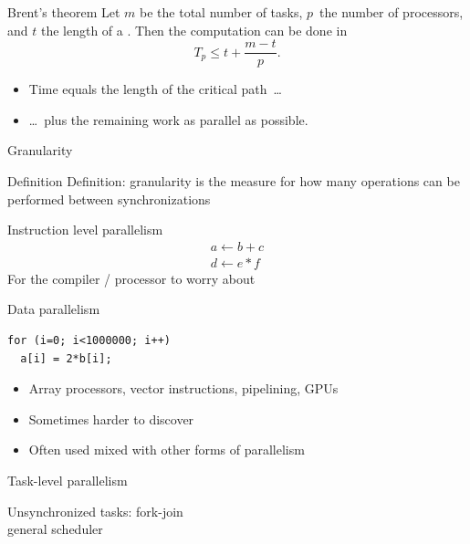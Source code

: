 \begin{numberedframe}{Brent's theorem}
    Let $m$ be the total number of tasks, $p$~the number of processors,
  and $t$ the length of a . Then
  the computation can be done in \[ T_p \leq t +\frac{m-t}{p}. \]

  \begin{itemize}
  \item Time equals the length of the critical path~\ldots
  \item \ldots~plus the remaining work as parallel as possible.
  \end{itemize}
\end{numberedframe}

 {Granularity}

\begin{numberedframe}{Definition}
  Definition: granularity is the measure for how many 
  operations can be performed between synchronizations
\end{numberedframe}

\begin{numberedframe}{Instruction level parallelism}
\[ 
\begin{array}{l}
  a\leftarrow b+c\\ d\leftarrow e*f
\end{array}
\]
For the compiler / processor to worry about
\end{numberedframe}

\begin{numberedframe}{Data parallelism}
\begin{lstlisting}
for (i=0; i<1000000; i++)
  a[i] = 2*b[i];
\end{lstlisting}
\begin{itemize}
\item Array processors, vector instructions, pipelining, GPUs
\item Sometimes harder to discover
\item Often used mixed with other forms of parallelism
\end{itemize}
\end{numberedframe}

\begin{numberedframe}{Task-level parallelism}

Unsynchronized tasks: fork-join\\
general scheduler

\end{numberedframe}

